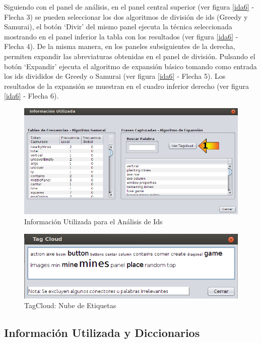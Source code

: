 \documentclass[a4paper,12pt]{report}
\begin{document}
Siguiendo con el panel de análisis, en el panel central superior (ver figura \ref{ida6} - Flecha 3) se pueden seleccionar los dos algoritmos de división de ids (Greedy y Samurai), el botón `Divir' del mismo panel ejecuta la técnica seleccionada mostrando en el panel inferior la tabla con los resultados (ver figura \ref{ida6} - Flecha 4). De la misma manera, en los paneles subsiguientes de la derecha, permiten expandir las abreviaturas obtenidas en el panel de división. Pulsando el botón `Expandir' ejecuta el algoritmo de expansión básico tomando como entrada los ids divididos de Greedy o Samurai (ver figura \ref{ida6} - Flecha 5). Los resultados de la expansión se muestran en el cuadro inferior derecho (ver figura \ref{ida6} - Flecha 6).

\begin{figure}[t] %
\centerline{%
\includegraphics[scale= 0.65]{./ida_07.png}
}
\caption{Información Utilizada para el Análisis de Ids}
\label{ida7}
\end{figure}

\begin{figure}[t] %
\centerline{%
\includegraphics[scale= 0.7]{./ida_08.png}
}
\caption{TagCloud: Nube de Etiquetas}
\label{ida8}
\end{figure}

\subsection{Información Utilizada y Diccionarios}
\end{document}
